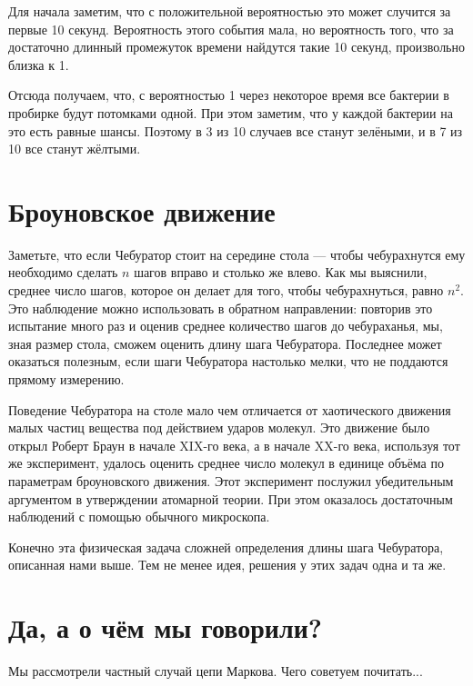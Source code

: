 \documentclass{article}
\begin{document}
Для начала заметим, что с положительной вероятностью это может случится за первые 10 секунд. 
Вероятность этого события мала,
но вероятность того, что за достаточно длинный промежуток времени найдутся такие 10 секунд, произвольно близка к 1.

Отсюда получаем, что, с вероятностью 1
через некоторое время все бактерии в пробирке будут потомками одной.
При этом заметим, что у каждой бактерии на это есть равные шансы.
Поэтому в 3 из 10 случаев все станут зелёными, и в 7 из 10 все станут жёлтыми.


\section{Броуновское движение}

Заметьте, что если Чебуратор стоит на середине стола ---
чтобы чебурахнутся ему необходимо сделать $n$ шагов вправо и столько же влево.
Как мы выяснили, 
среднее число шагов, которое он делает для того, чтобы чебурахнуться, 
равно $n^2$.
Это наблюдение можно использовать в обратном направлении:
повторив это испытание много раз и 
оценив среднее количество шагов до чебураханья, мы, 
зная размер стола, сможем оценить длину шага Чебуратора.
Последнее может оказаться полезным, если шаги Чебуратора настолько мелки, что не поддаются прямому измерению. 

Поведение Чебуратора на столе мало чем отличается 
от хаотического движения малых частиц вещества под действием ударов молекул. 
Это движение было открыл Роберт Браун в начале XIX-го века, а в начале XX-го века, используя тот же эксперимент, удалось оценить среднее число молекул в единице объёма по параметрам броуновского движения.
Этот эксперимент послужил убедительным аргументом в утверждении атомарной теории.
При этом оказалось достаточным наблюдений с помощью обычного микроскопа.

Конечно эта физическая задача сложней определения длины шага Чебуратора, описанная нами выше.
Тем не менее идея, решения у этих задач одна и та же.

\section{Да, а о чём мы говорили?}

Мы рассмотрели частный случай цепи Маркова.
Чего советуем почитать...
\end{document}
